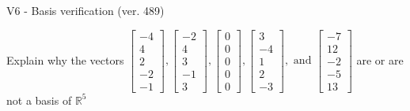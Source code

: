 \begin{exercise}
  \begin{exerciseTitle}V6 - Basis verification (ver. 489)\end{exerciseTitle}
  \begin{exerciseStatement}
    Explain why the vectors \(\left[\begin{array}{r}
-4 \\
4 \\
2 \\
-2 \\
-1
\end{array}\right] , \left[\begin{array}{r}
-2 \\
4 \\
3 \\
-1 \\
3
\end{array}\right] , \left[\begin{array}{r}
0 \\
0 \\
0 \\
0 \\
0
\end{array}\right] , \left[\begin{array}{r}
3 \\
-4 \\
1 \\
2 \\
-3
\end{array}\right] , \text{ and } \left[\begin{array}{r}
-7 \\
12 \\
-2 \\
-5 \\
13
\end{array}\right]\) are or are not a basis of \(\mathbb{R}^5\)	



\end{exerciseStatement}
\end{exercise}
